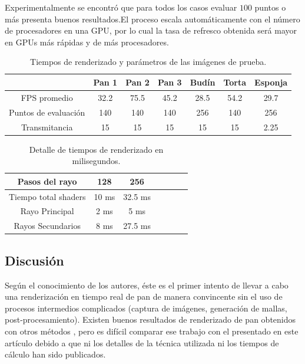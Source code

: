 \documentclass[oneside,a4paper,spanish,links]{amca}
\begin{document}
Experimentalmente se encontró que para todos los casos
evaluar $100$ puntos o más presenta buenos resultados.El proceso escala
automáticamente con el número de procesadores en una GPU, por lo cual
la tasa de refresco obtenida será mayor en GPUs más rápidas y de más
procesadores.

\begin{table}[htb]
\centering
\begin{tabular}{|c|c|c|c|c|c|c|}
\hline &  Pan 1 & Pan 2 & Pan 3 & Budín & Torta & Esponja \\
\hline
\hline
 FPS promedio  & 32.2 &  75.5 &  45.2 & 28.5 &  54.2 & 29.7\\
\hline
 Puntos de evaluación &  140 &  140 &  140 & 256 &  140 & 256 \\
\hline
 Transmitancia &  15 &  15 &  15 & 15 &  15 & 2.25 \\
\hline
\end{tabular}
\caption{Tiempos de renderizado y parámetros de las imágenes de prueba.}
\label{tab:n1}
\end{table}

\begin{table}[htb]
\centering
\begin{tabular}{|c|c|c|c|c|c|c|}
\hline
 Pasos del rayo         & 128 &  256 \\
\hline
\hline
 Tiempo total shaders   & 10 ms &  32.5 ms \\
\hline
 Rayo Principal         & 2 ms  & 5 ms  \\
\hline
 Rayos Secundarios      &  8 ms & 27.5 ms  \\
\hline
\end{tabular}
\caption{Detalle de tiempos de renderizado en milisegundos.}
\label{tab:n2}
\end{table}

\subsection{Discusi\'on}

Según el conocimiento de los autores, éste es el primer intento de llevar a cabo una renderización en tiempo real de pan de manera convincente sin el uso de procesos
intermedios complicados (captura de imágenes, generación de mallas,
post-procesamiento). Existen buenos resultados de renderizado de pan
obtenidos con otros métodos \citep{Cho2007}, pero es difícil
comparar ese trabajo con el presentado en este artículo debido a que
ni los detalles de la técnica utilizada ni los tiempos de cálculo han
sido publicados.
\end{document}
